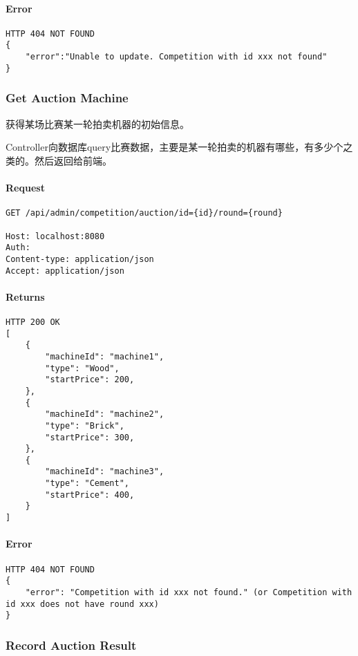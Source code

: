 \documentclass{article}
\begin{document}
\paragraph*{Error}
\begin{lstlisting}
HTTP 404 NOT FOUND
{
    "error":"Unable to update. Competition with id xxx not found"
}
\end{lstlisting}

\subsubsection{Get Auction Machine}

获得某场比赛某一轮拍卖机器的初始信息。

Controller向数据库query比赛数据，主要是某一轮拍卖的机器有哪些，有多少个之类的。然后返回给前端。

\paragraph*{Request}
\begin{lstlisting}
GET /api/admin/competition/auction/id={id}/round={round}

Host: localhost:8080
Auth:
Content-type: application/json
Accept: application/json
\end{lstlisting}

\paragraph*{Returns}
\begin{lstlisting}
HTTP 200 OK
[
    {
        "machineId": "machine1",
        "type": "Wood",
        "startPrice": 200,
    },
    {
        "machineId": "machine2",
        "type": "Brick",
        "startPrice": 300,
    },
    {
        "machineId": "machine3",
        "type": "Cement",
        "startPrice": 400,
    }
]
\end{lstlisting}

\paragraph*{Error}
\begin{lstlisting}
HTTP 404 NOT FOUND
{
    "error": "Competition with id xxx not found." (or Competition with id xxx does not have round xxx)
}
\end{lstlisting}

\subsubsection{Record Auction Result}
\end{document}
